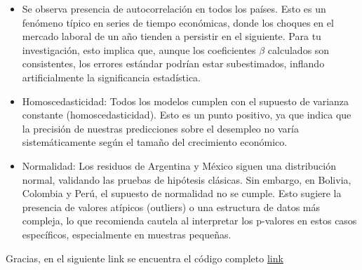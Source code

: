 \documentclass[
  11pt,
  letterpaper,
  DIV=11,
  numbers=noendperiod]{scrartcl}
\begin{document}
\begin{itemize}
\item
  Se observa presencia de autocorrelación en todos los países. Esto es
  un fenómeno típico en series de tiempo económicas, donde los choques
  en el mercado laboral de un año tienden a persistir en el siguiente.
  Para tu investigación, esto implica que, aunque los coeficientes
  \(\beta\) calculados son consistentes, los errores estándar podrían
  estar subestimados, inflando artificialmente la significancia
  estadística.
\item
  Homoscedasticidad: Todos los modelos cumplen con el supuesto de
  varianza constante (homoscedasticidad). Esto es un punto positivo, ya
  que indica que la precisión de nuestras predicciones sobre el
  desempleo no varía sistemáticamente según el tamaño del crecimiento
  económico.
\item
  Normalidad: Los residuos de Argentina y México siguen una distribución
  normal, validando las pruebas de hipótesis clásicas. Sin embargo, en
  Bolivia, Colombia y Perú, el supuesto de normalidad no se cumple. Esto
  sugiere la presencia de valores atípicos (outliers) o una estructura
  de datos más compleja, lo que recomienda cautela al interpretar los
  p-valores en estos casos específicos, especialmente en muestras
  pequeñas.
\end{itemize}

Gracias, en el siguiente link se encuentra el código completo
\href{https://github.com/juan-moreno31/TopicosEconometria/blob/cab08e1e423a264c058c21626392e5c367dc5afc/1TallerParcial.qmd}{link}
\end{document}
